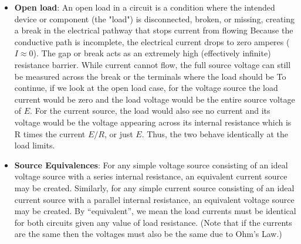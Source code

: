 \documentclass{report}
\begin{document}
\begin{itemize}
            \bigbreak \noindent 
            When you connect an external load (\[R_{load}\]): 
            \begin{itemize}
                \item The total current splits into two paths: some goes through \[R_{internal}\] (bleed current), and the rest goes to your load.
                \item Because they are in parallel, both paths experience the exact same voltage (V)
            \end{itemize}
            Since
            \begin{align*}
                I_{\text{internal}} = \frac{V}{\infty} = 0
            ,\end{align*}
            there is no internal current bleed.
        \item \textbf{Open load}: An open load in a circuit is a condition where the intended device or component (the "load") is disconnected, broken, or missing, creating a break in the electrical pathway that stops current from flowing
            \bigbreak \noindent 
            Because the conductive path is incomplete, the electrical current drops to zero amperes ($I \approx  0$).
            \bigbreak \noindent 
            The gap or break acts as an extremely high (effectively infinite) resistance barrier.
            \bigbreak \noindent 
            While current cannot flow, the full source voltage can still be measured across the break or the terminals where the load should be
            \bigbreak \noindent 
            To continue, if we look at the open load case, for the voltage source the load current would be zero and the load voltage would be the entire source voltage of $E$. For the current source, the load would also see no current and its voltage would be the voltage appearing across its internal resistance which is R times the current $E/R$, or just $E$. Thus, the two behave identically at the load limits.
        \item \textbf{Source Equivalences}: For any simple voltage source consisting of an ideal voltage source with a series internal resistance, an equivalent current source may be created. Similarly, for any simple current source consisting of an ideal current source with a parallel internal resistance, an equivalent voltage source may be created. By “equivalent”, we mean the load currents must be identical for both circuits given any value of load resistance. (Note that if the currents are the same then the voltages must also be the same due to Ohm’s Law.)

\end{itemize}
\end{document}
